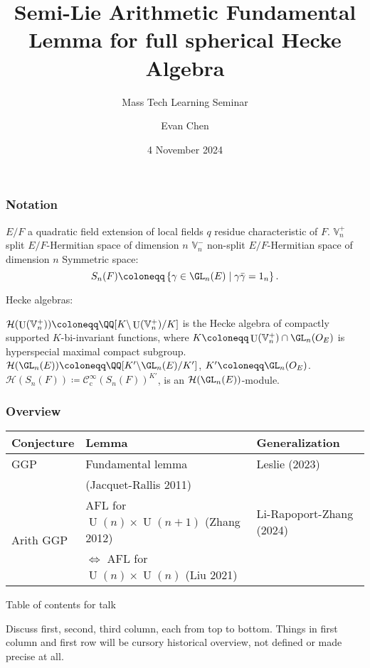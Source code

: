 \documentclass[11pt]{beamer}
\title[Semi-Lie AFL for full Hecke algebra]{Semi-Lie Arithmetic Fundamental Lemma for full spherical Hecke Algebra}
\subtitle{Mass Tech Learning Seminar}
\author{Evan Chen}
\date{4 November 2024}
\DeclareMathOperator{\U}{U}
\newcommand{\HH}{\mathcal{H}}
\newcommand{\VV}{\mathbb{V}}
\renewcommand{\OO}{O}
\begin{document}
\begin{frame}
  \maketitle
\end{frame}

\begin{frame}
  \frametitle{Notation}
  \begin{itemize}
  \ii $E/F$ a quadratic field extension of local fields
  \ii $q$ residue characteristic of $F$.
  \ii $\VV_n^+$ split $E/F$-Hermitian space of dimension $n$
  \ii $\VV_n^-$ non-split $E/F$-Hermitian space of dimension $n$
  \ii Symmetric space:
  \[ S_n(F) \coloneqq \left\{ \gamma \in \GL_n(E) \mid \gamma\bar\gamma = 1_n \right\} . \]
  \end{itemize}
  Hecke algebras:
  \begin{itemize}
  \ii $\HH(\U(\VV_n^+)) \coloneqq \QQ[K \backslash \U(\VV_n^+) \slash K]$
  is the Hecke algebra of compactly supported $K$-bi-invariant functions,
  where $K \coloneqq \U(\VV_n^+) \cap \GL_n(\OO_E)$ is hyperspecial maximal compact subgroup.
  \ii $\HH(\GL_n(E)) \coloneqq \QQ[K' \backslash \GL_n(E) \slash K']$, $K' \coloneqq \GL_n(\OO_E)$.
  \ii $\HH(S_n(F)) \coloneqq \mathcal C^\infty_{\text{c}} (S_n(F))^{K'}$,
  is an $\HH(\GL_n(E))$-module.
  \end{itemize}
\end{frame}


\begin{frame}
  \frametitle{Overview}
  \centering
  \begin{tabular}{lp{12em}p{8em}}
    \toprule
    \textbf{Conjecture} & \textbf{Lemma} & \textbf{Generalization} \\
    \midrule
    GGP & Fundamental lemma & Leslie (2023) \\ & (Jacquet-Rallis 2011) \\
    \midrule
    \multirow{2}{*}[-1em]{Arith GGP} & AFL for $\U(n) \times \U(n+1)$ (Zhang 2012) & Li-Rapoport-Zhang (2024) \\ \cline{2-3}
    & $\iff$ AFL for $\U(n) \times \U(n)$ (Liu 2021) & 🤔 \\
    \bottomrule
  \end{tabular}
  \begin{block}{Table of contents for talk}
    \begin{itemize}
    \ii Discuss first, second, third column, each from top to bottom.
    \ii Things in first column and first row will be cursory historical overview,
      not defined or made precise at all.
    \end{itemize}
  \end{block}
\end{frame}
\end{document}
